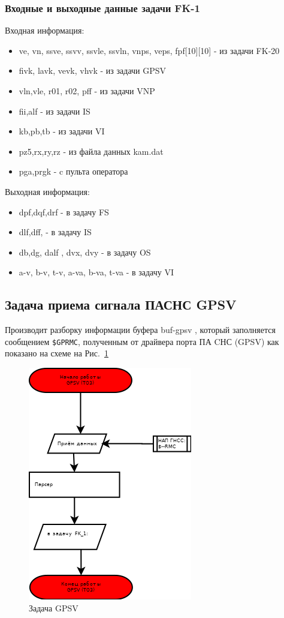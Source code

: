 \subsubsection{Входные и выходные данные задачи FK-1}
Входная информация:
\begin{itemize}
\item ve, vn, ssve, ssvv, ssvle, ssvln, vnps, veps, fpf[10][10] - из задачи   FK-20
\item fivk, lavk, vevk, vhvk - из задачи   GPSV
\item vln,vle, r01, r02, pff - из задачи VNP
\item fii,alf - из  задачи  IS
\item kb,pb,tb - из задачи VI
\item pz5,rx,ry,rz - из файла данных kam.dat
\item  pga,prgk  - c пульта оператора
\end{itemize}
Выходная информация:
\begin{itemize}
    \item dpf,dqf,drf - в задачу  FS
    \item dlf,dff, - в задачу  IS
    \item db,dg, dalf , dvx, dvy - в задачу OS
    \item a-v, b-v, t-v, a-va, b-va, t-va - в задачу  VI
\end{itemize}
\subsection{Задача приема сигнала ПАСНС GPSV}
Производит  разборку информации  буфера  buf-gpsv , который заполняется сообщением \verb|$GPRMC|, 
полученным от  драйвера  порта  ПА CНС (GPSV) как показано на схеме на Рис.~\ref{fig:GPSV}
\begin{figure}[H]
    \centering
    \includegraphics[width=0.75\linewidth]{images/GPSV.png}
    \caption{Задача GPSV}
    \label{fig:GPSV}
\end{figure}
